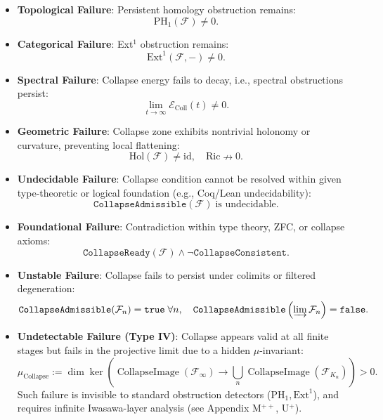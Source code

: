 \documentclass[11pt]{article}
\newcommand{\CollapseImage}{\operatorname{CollapseImage}}
\newcommand{\CollapseEnergy}{\mathcal{E}_{\mathrm{Coll}}}
\begin{document}
\begin{itemize}
    \item \textbf{Topological Failure}: Persistent homology obstruction remains:
    \[
    \mathrm{PH}_1(\mathcal{F}) \neq 0.
    \]
    
    \item \textbf{Categorical Failure}: Ext$^1$ obstruction remains:
    \[
    \mathrm{Ext}^1(\mathcal{F}, -) \neq 0.
    \]
    
    \item \textbf{Spectral Failure}: Collapse energy fails to decay, i.e., spectral obstructions persist:
    \[
    \lim_{t \to \infty} \CollapseEnergy(t) \neq 0.
    \]
    
    \item \textbf{Geometric Failure}: Collapse zone exhibits nontrivial holonomy or curvature, preventing local flattening:
    \[
    \text{Hol}(\mathcal{F}) \neq \mathrm{id}, \quad \mathrm{Ric} \nrightarrow 0.
    \]
    
    \item \textbf{Undecidable Failure}: Collapse condition cannot be resolved within given type-theoretic or logical foundation (e.g., Coq/Lean undecidability):
    \[
    \texttt{CollapseAdmissible}(\mathcal{F}) \;\text{is undecidable}.
    \]
    
    \item \textbf{Foundational Failure}: Contradiction within type theory, ZFC, or collapse axioms:
    \[
    \texttt{CollapseReady}(\mathcal{F}) \wedge \neg \texttt{CollapseConsistent}.
    \]
    
    \item \textbf{Unstable Failure}: Collapse fails to persist under colimits or filtered degeneration:
    \[
    \texttt{CollapseAdmissible}(\mathcal{F}_n) = \texttt{true} \;\forall n, \quad
    \texttt{CollapseAdmissible}\left( \varinjlim \mathcal{F}_n \right) = \texttt{false}.
    \]
    
    \item \textbf{Undetectable Failure (Type IV)}: Collapse appears valid at all finite stages but fails in the projective limit due to a hidden $\mu$-invariant:
    \[
    \mu_{\mathrm{Collapse}} := \dim \ker \left( \CollapseImage(\mathcal{F}_\infty) \to \bigcup_n \CollapseImage(\mathcal{F}_{K_n}) \right) > 0.
    \]
    Such failure is invisible to standard obstruction detectors (\( \mathrm{PH}_1, \mathrm{Ext}^1 \)), and requires infinite Iwasawa-layer analysis (see Appendix M$^{++}$, U$^+$).
\end{itemize}
\end{document}
